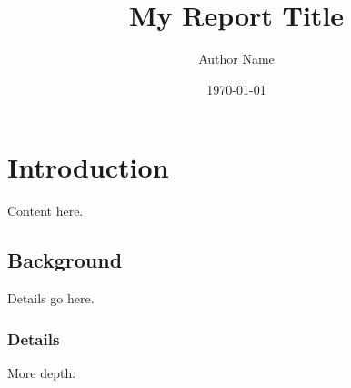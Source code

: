 \documentclass{report}
\title{My Report Title}
\author{Author Name}
\date{\today}
\begin{document}
\maketitle

\chapter{Introduction}
Content here.

\section{Background}
Details go here.

\subsection{Details}
More depth.
\end{document}
